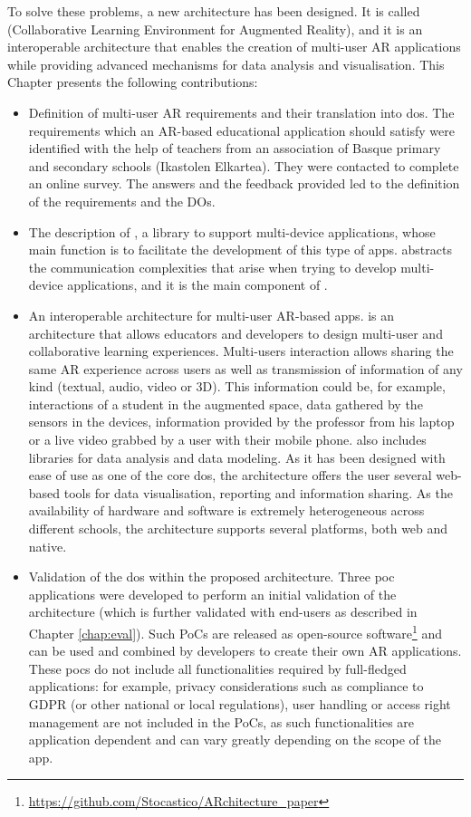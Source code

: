To solve these problems, a new architecture has been designed. It is called \arch{} (Collaborative Learning Environment for Augmented Reality), and it is an interoperable architecture that enables the creation of multi-user AR applications while providing advanced mechanisms for data analysis and visualisation. This Chapter presents the following contributions:
\begin{itemize}
    \item Definition of multi-user AR requirements and their translation into \glspl{do}. The requirements which an AR-based educational application should satisfy were identified with the help of teachers from an association of Basque primary and secondary schools (Ikastolen Elkartea). They were contacted to complete an online survey. The answers and the feedback provided led to the definition of the requirements and the DOs.
    \item The description of \textit{\ork{}}, a library to support multi-device applications, whose main function is to facilitate the development of this type of apps. \textit{\ork{}} abstracts the communication complexities that arise when trying to develop multi-device applications, and it is the main component of \arch{}.
    \item An interoperable architecture for multi-user AR-based apps. \arch{} is an architecture that allows educators and developers to design multi-user and collaborative learning experiences. Multi-users interaction allows sharing the same AR experience across users as well as transmission of information of any kind (textual, audio, video or 3D). This information could be, for example, interactions of a student in the augmented space, data gathered by the sensors in the devices, information provided by the professor from his laptop or a live video grabbed by a user with their mobile phone. \arch{} also includes libraries for data analysis and data modeling. As it has been designed with ease of use as one of the core \glspl{do}, the architecture offers the user several web-based tools for data visualisation, reporting and information sharing. As the availability of hardware and software is extremely heterogeneous across different schools, the architecture supports several platforms, both web and native.
    \item Validation of the \glspl{do} within the proposed architecture. Three \gls{poc} applications were developed to perform an initial validation of the architecture (which is further validated with end-users as described in Chapter \ref{chap:eval}). Such PoCs are released as open-source software\footnote{\url{https://github.com/Stocastico/ARchitecture_paper}} and can be used and combined by developers to create their own AR applications. These \glspl{poc} do not include all functionalities required by full-fledged applications: for example, privacy considerations such as compliance to GDPR (or other national or local regulations), user handling or access right management are not included in the PoCs, as such functionalities are application dependent and can vary greatly depending on the scope of the app.
\end{itemize}

